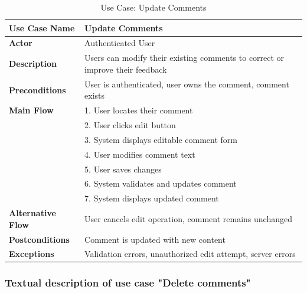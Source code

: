 \begin{table}[H]
\centering
\caption{Use Case: Update Comments}
\begin{tabular}{|p{3cm}|p{10cm}|}
\hline
\textbf{Use Case Name} & Update Comments \\
\hline
\textbf{Actor} & Authenticated User \\
\hline
\textbf{Description} & Users can modify their existing comments to correct or improve their feedback \\
\hline
\textbf{Preconditions} & User is authenticated, user owns the comment, comment exists \\
\hline
\textbf{Main Flow} & 
1. User locates their comment \\
& 2. User clicks edit button \\
& 3. System displays editable comment form \\
& 4. User modifies comment text \\
& 5. User saves changes \\
& 6. System validates and updates comment \\
& 7. System displays updated comment \\
\hline
\textbf{Alternative Flow} & User cancels edit operation, comment remains unchanged \\
\hline
\textbf{Postconditions} & Comment is updated with new content \\
\hline
\textbf{Exceptions} & Validation errors, unauthorized edit attempt, server errors \\
\hline
\end{tabular}
\end{table}

\subsubsection{Textual description of use case "Delete comments"}

